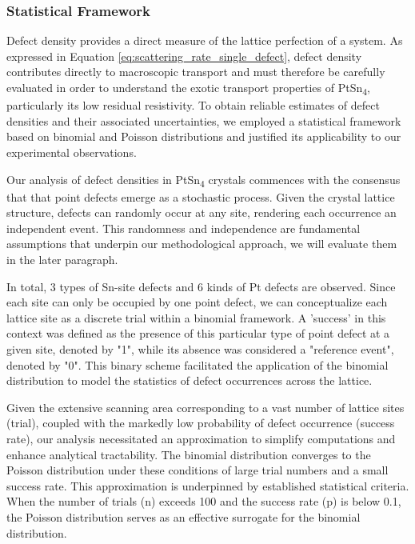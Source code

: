 \subsubsection{Statistical Framework}
Defect density provides a direct measure of the lattice perfection of a system. As expressed in Equation \ref{eq:scattering_rate_single_defect}, defect density contributes directly to macroscopic transport and must therefore be carefully evaluated in order to understand the exotic transport properties of PtSn\textsubscript{4}, particularly its low residual resistivity. To obtain reliable estimates of defect densities and their associated uncertainties, we employed a statistical framework based on binomial and Poisson distributions and justified its applicability to our experimental observations.
\par Our analysis of defect densities in PtSn\textsubscript{4} crystals commences with the consensus that that point defects emerge as a stochastic process\cite{rudolphDefectFormationCrystal2010,mosquera-loisImperfectionsAreNot2023}. Given the crystal lattice structure, defects can randomly occur at any site, rendering each occurrence an independent event. This randomness and independence are fundamental assumptions that underpin our methodological approach, we will evaluate them in the later paragraph.  
\par In total, 3 types of Sn-site defects and 6 kinds of Pt defects are observed. Since each site can only be occupied by one point defect, we can conceptualize each lattice site as a discrete trial within a binomial framework. A 'success' in this context was defined as the presence of this particular type of point defect at a given site, denoted by "1", while its absence was considered a "reference event", denoted by "0". This binary scheme facilitated the application of the binomial distribution to model the statistics of defect occurrences across the lattice.
\par Given the extensive scanning area corresponding to a vast number of lattice sites (trial), coupled with the markedly low probability of defect occurrence (success rate), our analysis necessitated an approximation to simplify computations and enhance analytical tractability. The 
binomial distribution converges to the Poisson distribution under these conditions of large trial numbers and a small success rate. This approximation is underpinned by established statistical criteria. When the number of trials (n) exceeds 100 and the success rate (p) is below 0.1, the Poisson distribution serves as an effective surrogate for the binomial distribution. 
